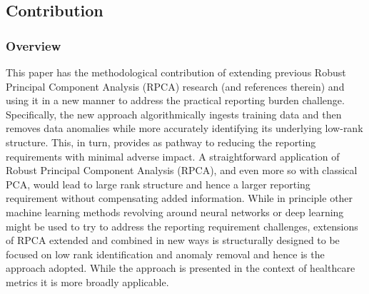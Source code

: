\documentclass[conference]{IEEEtran}
\begin{document}
\subsection{Contribution}
\subsubsection{Overview}
This paper has the methodological contribution of extending previous Robust Principal Component Analysis (RPCA) research \cite{paffenroth2018robust,Paffenroth2012} (and references therein) and using it in a new manner to address the practical reporting burden challenge.  Specifically,  the new approach  algorithmically ingests training data and then removes data anomalies while more accurately identifying its underlying low-rank structure. This, in turn, provides as pathway to reducing the reporting requirements with minimal adverse impact. A straightforward application of Robust Principal Component Analysis (RPCA), and even more so with classical PCA, would lead to large rank structure and hence a  larger reporting requirement without compensating added information.  While in principle other machine learning methods revolving around neural networks or deep learning might be used to try to address the reporting requirement challenges, extensions of RPCA extended and combined in new ways is structurally designed to be focused on low rank identification and anomaly removal and hence is the approach adopted.   While the approach  is presented in the context of healthcare metrics it is more broadly applicable.  %

\end{document}
